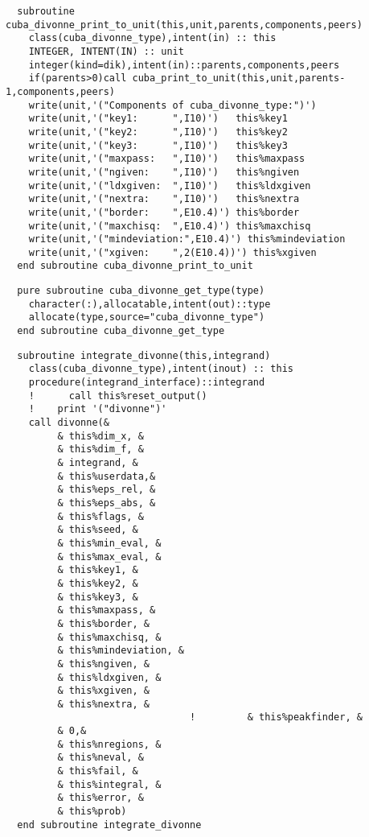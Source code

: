 \begin{Verbatim}
  subroutine cuba_divonne_print_to_unit(this,unit,parents,components,peers)
    class(cuba_divonne_type),intent(in) :: this
    INTEGER, INTENT(IN) :: unit
    integer(kind=dik),intent(in)::parents,components,peers
    if(parents>0)call cuba_print_to_unit(this,unit,parents-1,components,peers)
    write(unit,'("Components of cuba_divonne_type:")')
    write(unit,'("key1:      ",I10)')   this%key1
    write(unit,'("key2:      ",I10)')   this%key2
    write(unit,'("key3:      ",I10)')   this%key3
    write(unit,'("maxpass:   ",I10)')   this%maxpass
    write(unit,'("ngiven:    ",I10)')   this%ngiven
    write(unit,'("ldxgiven:  ",I10)')   this%ldxgiven
    write(unit,'("nextra:    ",I10)')   this%nextra
    write(unit,'("border:    ",E10.4)') this%border
    write(unit,'("maxchisq:  ",E10.4)') this%maxchisq
    write(unit,'("mindeviation:",E10.4)') this%mindeviation
    write(unit,'("xgiven:    ",2(E10.4))') this%xgiven
  end subroutine cuba_divonne_print_to_unit
\end{Verbatim}
\begin{Verbatim}
  pure subroutine cuba_divonne_get_type(type)
    character(:),allocatable,intent(out)::type
    allocate(type,source="cuba_divonne_type")
  end subroutine cuba_divonne_get_type
\end{Verbatim}
\begin{Verbatim}
  subroutine integrate_divonne(this,integrand)
    class(cuba_divonne_type),intent(inout) :: this  
    procedure(integrand_interface)::integrand
    !      call this%reset_output()
    !    print '("divonne")'
    call divonne(&
         & this%dim_x, &
         & this%dim_f, &
         & integrand, &
         & this%userdata,&
         & this%eps_rel, &
         & this%eps_abs, &
         & this%flags, &
         & this%seed, &
         & this%min_eval, &
         & this%max_eval, &
         & this%key1, &
         & this%key2, &
         & this%key3, &
         & this%maxpass, &
         & this%border, &
         & this%maxchisq, &
         & this%mindeviation, &
         & this%ngiven, &
         & this%ldxgiven, &
         & this%xgiven, &
         & this%nextra, &
                                !         & this%peakfinder, &
         & 0,&
         & this%nregions, &
         & this%neval, &
         & this%fail, &
         & this%integral, &
         & this%error, &
         & this%prob)
  end subroutine integrate_divonne
\end{Verbatim}

